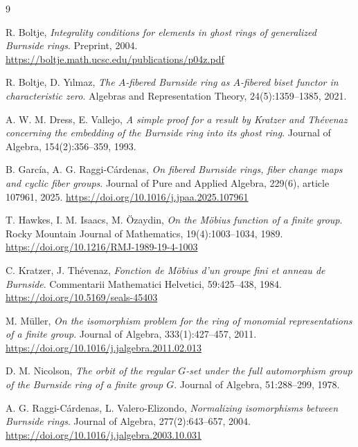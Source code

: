 \documentclass[letterpaper,12pt]{article}
\theoremstyle{plain}
\theoremstyle{definition}
\begin{document}
\begin{thebibliography}{9}

R. Boltje,
\emph{Integrality conditions for elements in ghost rings of generalized Burnside rings}.
Preprint, 2004. \url{https://boltje.math.ucsc.edu/publications/p04z.pdf}

R. Boltje, D. Y{\i}lmaz,
\emph{The $A$-fibered Burnside ring as $A$-fibered biset functor in characteristic zero}.
Algebras and Representation Theory, 24(5):1359--1385, 2021.

A. W. M. Dress, E. Vallejo,
\emph{A simple proof for a result by Kratzer and Thévenaz concerning the embedding of the Burnside ring into its ghost ring}.
Journal of Algebra, 154(2):356--359, 1993.

B. García, A. G. Raggi-Cárdenas,
\emph{On fibered Burnside rings, fiber change maps and cyclic fiber groups}.
Journal of Pure and Applied Algebra, 229(6), article 107961, 2025.
\url{https://doi.org/10.1016/j.jpaa.2025.107961}

T. Hawkes, I. M. Isaacs, M. Özaydin,
\emph{On the Möbius function of a finite group}.
Rocky Mountain Journal of Mathematics, 19(4):1003--1034, 1989.
\url{https://doi.org/10.1216/RMJ-1989-19-4-1003}

C. Kratzer, J. Thévenaz,
\emph{Fonction de Möbius d'un groupe fini et anneau de Burnside}.
Commentarii Mathematici Helvetici, 59:425--438, 1984.
\url{https://doi.org/10.5169/seals-45403}

M. Müller,
\emph{On the isomorphism problem for the ring of monomial representations of a finite group}.
Journal of Algebra, 333(1):427--457, 2011.
\url{https://doi.org/10.1016/j.jalgebra.2011.02.013}

D. M. Nicolson,
\emph{The orbit of the regular $G$-set under the full automorphism group of the Burnside ring of a finite group $G$}.
Journal of Algebra, 51:288--299, 1978.

A. G. Raggi-Cárdenas, L. Valero-Elizondo,
\emph{Normalizing isomorphisms between Burnside rings}.
Journal of Algebra, 277(2):643--657, 2004.
\url{https://doi.org/10.1016/j.jalgebra.2003.10.031}

\end{thebibliography}
\end{document}
